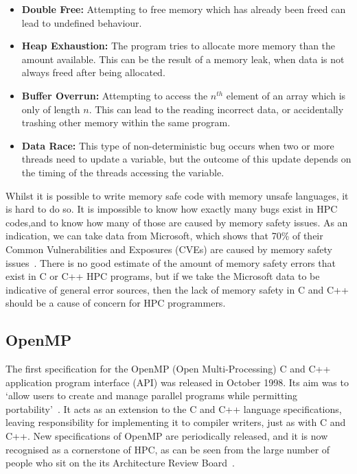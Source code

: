 \begin{itemize}
    \item \textbf{Double Free:} Attempting to free memory which has already been freed can lead to undefined behaviour.
    \item \textbf{Heap Exhaustion:} The program tries to allocate more memory than the amount available. This can be the result of a memory leak, when data is not always freed after being allocated.
    \item \textbf{Buffer Overrun:} Attempting to access the $n^{th}$ element of an array which is only of length $n$. This can lead to the reading incorrect data, or accidentally trashing other memory within the same program.
    \item \textbf{Data Race:} This type of non-deterministic bug occurs when two or more threads need to update a variable, but the outcome of this update depends on the timing of the threads accessing the variable. 
\end{itemize}

Whilst it is possible to write memory safe code with memory unsafe languages, it is hard to do so. It is impossible to know how exactly many bugs exist in HPC codes,and to know how many of those are caused by memory safety issues.
As an indication, we can take data from Microsoft, which shows that 70\% of their Common Vulnerabilities and Exposures (CVEs) are caused by memory safety issues~\cite{MicroBugs}. There is no good estimate of the amount of memory safety errors that exist in C or C++ HPC programs, but if we take the Microsoft data to be indicative of general error sources, then the lack of memory safety in C and C++ should be a cause of concern for HPC programmers.

\subsection{OpenMP}
The first specification for the OpenMP (Open Multi-Processing) C and C++ application program interface (API) was released in October 1998. Its aim was to `allow users to create and manage parallel programs while permitting portability'~\cite{OpenMPSpec}. It acts as an extension to the C and C++ language specifications, leaving responsibility for implementing it to compiler writers, just as with C and C++. New specifications of OpenMP are periodically released, and it is now recognised as a cornerstone of HPC, as can be seen from the large number of people who sit on the its Architecture Review Board~\cite{OpenMPARB}.


